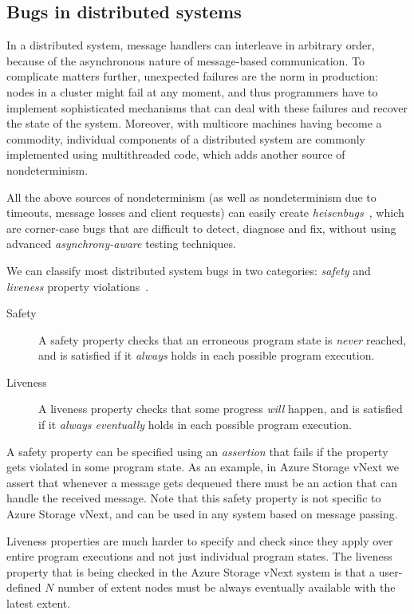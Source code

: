 \subsection{Bugs in distributed systems}
\label{sec:overview:bugs}

In a distributed system, message handlers can interleave in arbitrary order, because of the asynchronous nature of message-based communication. To complicate matters further, unexpected failures are the norm in production: nodes in a cluster might fail at any moment, and thus programmers have to implement sophisticated mechanisms that can deal with these failures and recover the state of the system. Moreover, with multicore machines having become a commodity, individual components of a distributed system are commonly implemented using multithreaded code, which adds another source of nondeterminism.

All the above sources of nondeterminism (as well as nondeterminism due to timeouts, message losses and client requests) can easily create \emph{heisenbugs}~\cite{gray1986computers, musuvathi2008finding}, which are corner-case bugs that are difficult to detect, diagnose and fix, without using advanced \emph{asynchrony-aware} testing techniques.

We can classify most distributed system bugs in two categories: \emph{safety} and \emph{liveness} property violations~\cite{lamport1977proving}.

\begin{description}
\item[Safety] A safety property checks that an erroneous program state is \emph{never} reached, and is satisfied if it \emph{always} holds in each possible program execution.

\item[Liveness] A liveness property checks that some progress \emph{will} happen, and is satisfied if it \emph{always eventually} holds in each possible program execution.
\end{description}

\noindent
A safety property can be specified using an \emph{assertion} that fails if the property gets violated in some program state. As an example, in Azure Storage vNext we assert that whenever a message gets dequeued there must be an action that can handle the received message. Note that this safety property is not specific to Azure Storage vNext, and can be used in any system based on message passing.

Liveness properties are much harder to specify and check since they apply over entire program executions and not just individual program states. The liveness property that is being checked in the Azure Storage vNext system is that a user-defined $N$ number of extent nodes must be always eventually available with the latest extent. 


